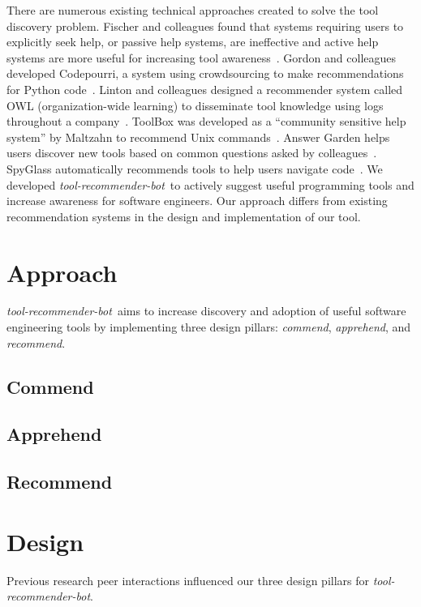 \documentclass[sigconf,review,anonymous]{acmart}
\newcommand{\tool}{\textsl{tool-recommender-bot}}
\begin{document}
There are numerous existing technical approaches created to solve the tool discovery problem. Fischer and colleagues found that systems requiring users to explicitly seek help, or passive help systems, are ineffective and active help systems are more useful for increasing tool awareness~\cite{Fischer1984ActiveHelpSystems}. Gordon and colleagues developed Codepourri, a system using crowdsourcing to make recommendations for Python code~\cite{Gordon2015Codepourri}. Linton and colleagues designed a recommender system called OWL (organization-wide learning) to disseminate tool knowledge using logs throughout a company~\cite{Linton2000OWL}. ToolBox was developed as a ``community sensitive help system'' by Maltzahn to recommend Unix commands~\cite{Maltzahn1995Toolbox}. Answer Garden helps users discover new tools based on common questions asked by colleagues~\cite{Ackerman1990AnswerGarden}. SpyGlass automatically recommends tools to help users navigate code~\cite{Viriyakattiyaporn2010Spyglass}. We developed \tool~to actively suggest useful programming tools and increase awareness for software engineers. Our approach differs from existing recommendation systems in the design and implementation of our tool.

\section{Approach}

\tool~aims to increase discovery and adoption of useful software engineering tools by implementing three design pillars: \textit{commend}, \textit{apprehend}, and \textit{recommend}.

\subsection{Commend}

\subsection{Apprehend}

\subsection{Recommend}

\section{Design}

Previous research peer interactions influenced our three design pillars for \tool.
\end{document}
